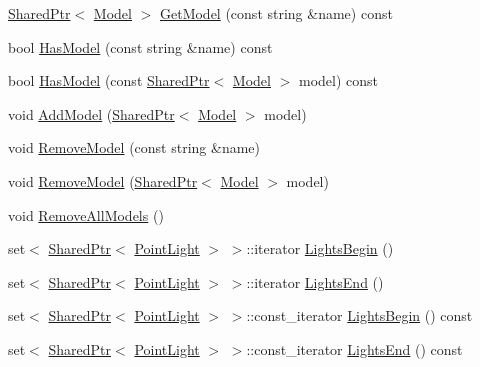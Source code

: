 \begin{DoxyCompactItemize}
\hyperlink{namespacemage_a1e01ae66713838a7a67d30e44c67703e}{Shared\+Ptr}$<$ \hyperlink{classmage_1_1_model}{Model} $>$ \hyperlink{classmage_1_1_world_ac91abee028df87d8879332e0df3d9e8a}{Get\+Model} (const string \&name) const
\item 
bool \hyperlink{classmage_1_1_world_a381e0a56fc1ba6d0955a248f7b0f0c22}{Has\+Model} (const string \&name) const
\item 
bool \hyperlink{classmage_1_1_world_a821d420241b2a94502b20e24595490df}{Has\+Model} (const \hyperlink{namespacemage_a1e01ae66713838a7a67d30e44c67703e}{Shared\+Ptr}$<$ \hyperlink{classmage_1_1_model}{Model} $>$ model) const
\item 
void \hyperlink{classmage_1_1_world_a4b7287a11ff316b029ec7727ed0d076d}{Add\+Model} (\hyperlink{namespacemage_a1e01ae66713838a7a67d30e44c67703e}{Shared\+Ptr}$<$ \hyperlink{classmage_1_1_model}{Model} $>$ model)
\item 
void \hyperlink{classmage_1_1_world_aebba267c6c47de1c806ffe49be273dea}{Remove\+Model} (const string \&name)
\item 
void \hyperlink{classmage_1_1_world_afad0c7024fcd304bb582bdc1d281c590}{Remove\+Model} (\hyperlink{namespacemage_a1e01ae66713838a7a67d30e44c67703e}{Shared\+Ptr}$<$ \hyperlink{classmage_1_1_model}{Model} $>$ model)
\item 
void \hyperlink{classmage_1_1_world_af3bae7b62192de9edda5e0567b73be93}{Remove\+All\+Models} ()
\item 
set$<$ \hyperlink{namespacemage_a1e01ae66713838a7a67d30e44c67703e}{Shared\+Ptr}$<$ \hyperlink{structmage_1_1_point_light}{Point\+Light} $>$ $>$\+::iterator \hyperlink{classmage_1_1_world_a48964d5262a080dd866e612d7daa6bf2}{Lights\+Begin} ()
\item 
set$<$ \hyperlink{namespacemage_a1e01ae66713838a7a67d30e44c67703e}{Shared\+Ptr}$<$ \hyperlink{structmage_1_1_point_light}{Point\+Light} $>$ $>$\+::iterator \hyperlink{classmage_1_1_world_a52c035bf11269bb9cc6fb537532bfeab}{Lights\+End} ()
\item 
set$<$ \hyperlink{namespacemage_a1e01ae66713838a7a67d30e44c67703e}{Shared\+Ptr}$<$ \hyperlink{structmage_1_1_point_light}{Point\+Light} $>$ $>$\+::const\+\_\+iterator \hyperlink{classmage_1_1_world_a45b3876de39fd5d7bd176f029cf4c535}{Lights\+Begin} () const
\item 
set$<$ \hyperlink{namespacemage_a1e01ae66713838a7a67d30e44c67703e}{Shared\+Ptr}$<$ \hyperlink{structmage_1_1_point_light}{Point\+Light} $>$ $>$\+::const\+\_\+iterator \hyperlink{classmage_1_1_world_a752ce259cdcffdfba51e2c9e480d2ddc}{Lights\+End} () const

\end{DoxyCompactItemize}
